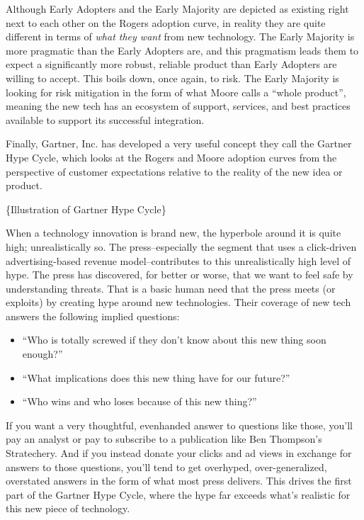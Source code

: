 Although Early Adopters and the Early Majority are depicted as existing right next to each other on the Rogers adoption curve, in reality they are quite different in terms of \emph{what they want} from new technology. The Early Majority is more pragmatic than the Early Adopters are, and this pragmatism leads them to expect a significantly more robust, reliable product than Early Adopters are willing to accept. This boils down, once again, to risk. The Early Majority is looking for risk mitigation in the form of what Moore calls a ``whole product'', meaning the new tech has an ecosystem of support, services, and best practices available to support its successful integration.

Finally, Gartner, Inc. has developed a very useful concept they call the Gartner Hype Cycle, which looks at the Rogers and Moore adoption curves from the perspective of customer expectations relative to the reality of the new idea or product.

\{Illustration of Gartner Hype Cycle\}

When a technology innovation is brand new, the hyperbole around it is quite high; unrealistically so. The press--especially the segment that uses a click-driven advertising-based revenue model--contributes to this unrealistically high level of hype. The press has discovered, for better or worse, that we want to feel safe by understanding threats. That is a basic human need that the press meets (or exploits) by creating hype around new technologies. Their coverage of new tech answers the following implied questions:

\begin{itemize}
\item ``Who is totally screwed if they don't know about this new thing soon enough?''
\item ``What implications does this new thing have for our future?''
\item ``Who wins and who loses because of this new thing?''
\end{itemize}

If you want a very thoughtful, evenhanded answer to questions like those, you'll pay an analyst or pay to subscribe to a publication like Ben Thompson's Stratechery. And if you instead donate your clicks and ad views in exchange for answers to those questions, you'll tend to get overhyped, over-generalized, overstated answers in the form of what most press delivers.  This drives the first part of the Gartner Hype Cycle, where the hype far exceeds what's realistic for this new piece of technology.

